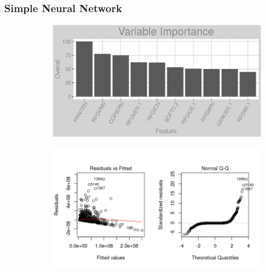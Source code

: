 \subsubsection{Simple Neural Network}
\label{appendix:electricity:snn}
\begin{figure}[h]
\centering
\begin{subfigure}{1\textwidth}
\centering
\includegraphics[width=.99\textwidth, height=0.3\textheight]{Images/electricity_nn_vars.png}
\end{subfigure}
\begin{subfigure}{1\textwidth}
\centering
\includegraphics[width=.99\textwidth, height=0.475\textheight]{Images/electricity_nn_res_1.png}
\end{subfigure}
\end{figure}
\newpage
